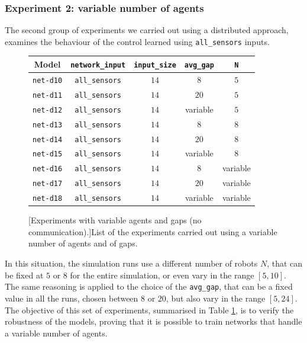 \subsubsection{Experiment 2: variable number of agents}
\label{subsubsec:task1-exp-distr-2}
The second group of experiments we carried out using a distributed approach, 
examines the behaviour of the control learned using \texttt{all\_sensors} inputs. 
\begin{figure}[H]
	\centering
	\begin{tabular}{ccccc}
		\toprule
		\textbf{Model} \quad & \textbf{\texttt{network\_input}} & 
		\textbf{\texttt{input\_size}} & \textbf{\texttt{avg\_gap}} & \textbf{\texttt{N}}\\
		\midrule
		\texttt{net-d10} 	& \texttt{all\_sensors}		&  $14$  &  $8$		 	 &	$5$ \\
		\texttt{net-d11} 	& \texttt{all\_sensors}		&  $14$  &  $20$		&	$5$ \\
		\texttt{net-d12} 	& \texttt{all\_sensors}		&  $14$  &  variable   &	$5$ \\
		\texttt{net-d13} 	& \texttt{all\_sensors}	  	&  $14$  &  $8$			 &	  $8$ \\
		\texttt{net-d14} 	& \texttt{all\_sensors}	  	&  $14$  &  $20$   		&	 $8$ \\
		\texttt{net-d15} 	& \texttt{all\_sensors}	  	&  $14$  &  variable	&	 $8$ \\
		\texttt{net-d16} 	& \texttt{all\_sensors}	  	&  $14$  &  $ 8$		  &	 variable\\
		\texttt{net-d17} 	& \texttt{all\_sensors}	  	&  $14$  &  $20$		 &	variable\\
		\texttt{net-d18} 	& \texttt{all\_sensors}	  	&  $14$  &  variable	 &	
		variable\\
		\bottomrule
	\end{tabular}
	[Experiments with variable agents and gaps (no 
	communication).]{List of the experiments carried out using a variable 
		number of agents and of gaps.}
	\label{tab:modeldist}
\end{figure}
In this situation, the simulation runs use a different number of robots $N$, that 
can be fixed at $5$ or $8$ for the entire simulation, or even vary in the range $[5, 
10]$. The same reasoning is applied to the choice of the \texttt{avg\_gap}, that 
can be a fixed value in all the runs, chosen between $8$ or $20$, but also vary in 
the range $[5, 24]$. 
The objective of this set of experiments, summarised in Table \ref{tab:modeldist}, 
is to verify the robustness of the models, proving that it is possible to train 
networks that handle a variable number of agents. 

